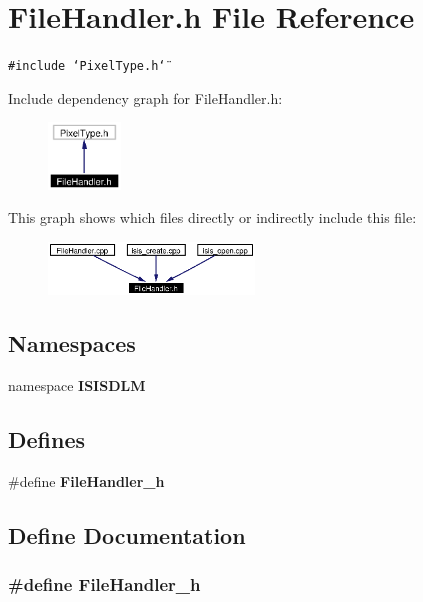 \section{File\-Handler.h File Reference}
\label{FileHandler_8h}
{\tt \#include \char`\"{}Pixel\-Type.h\char`\"{}}\par


Include dependency graph for File\-Handler.h:\begin{figure}[H]
\begin{center}
\leavevmode
\includegraphics[width=55pt]{FileHandler_8h__incl}
\end{center}
\end{figure}


This graph shows which files directly or indirectly include this file:\begin{figure}[H]
\begin{center}
\leavevmode
\includegraphics[width=155pt]{FileHandler_8h__dep__incl}
\end{center}
\end{figure}
\subsection*{Namespaces}
\begin{CompactItemize}
\item 
namespace {\bf ISISDLM}
\end{CompactItemize}
\subsection*{Defines}
\begin{CompactItemize}
\item 
\#define {\bf File\-Handler\_\-h}
\end{CompactItemize}


\subsection{Define Documentation}
\subsubsection{\setlength{\rightskip}{0pt plus 5cm}\#define File\-Handler\_\-h}\label{FileHandler_8h_a0}


